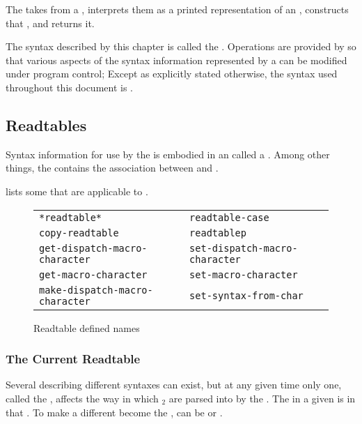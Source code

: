 

The  takes  from a , 
interprets them as a printed representation of an ,
constructs that , and returns it.

The syntax described by this chapter is called the .
Operations are provided by \commonlisp{} so that
various aspects of the syntax information represented by a  
can be modified under program control; 
Except as explicitly stated otherwise, 
the syntax used throughout this document is .

\subsection{Readtables}
\label{subsection-character-syntax-readtables}

Syntax information for use by the  is embodied in an
 called a .  Among other things, 
the  contains the association between  
and .

lists some  that are applicable to
.

\begin{figure}
\begin{tabular}{ll}
\texttt{*readtable*} & \texttt{readtable-case}\\
\texttt{copy-readtable} & \texttt{readtablep}\\
\texttt{get-dispatch-macro-character} & \texttt{set-dispatch-macro-character}\\
\texttt{get-macro-character} & \texttt{set-macro-character}\\
\texttt{make-dispatch-macro-character} & \texttt{set-syntax-from-char}\\
\end{tabular}
\caption{\label{readtable-defined-names}
Readtable defined names}
\end{figure}

\subsubsection{The Current Readtable}

Several  describing different syntaxes can exist,
but at any given time only one, called the , 
affects the way in which $_2$ are parsed 
into  by the .
The  in a given 
is  in that .
To make a different  become the ,
 can be  or .

